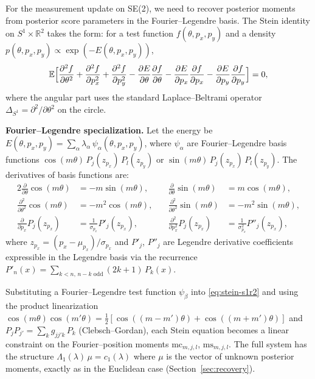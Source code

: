 \documentclass{article}
\newcommand{\R}{\mathbb{R}}
\newcommand{\E}{\mathbb{E}}
\theoremstyle{definition}
\begin{document}
For the measurement update on SE(2), we need to recover posterior
moments from posterior score parameters in the Fourier--Legendre basis.
The Stein identity on $S^1 \times \R^2$ takes the form:
for a test function $f(\theta, p_x, p_y)$ and a density
$p(\theta, p_x, p_y) \propto \exp(-E(\theta, p_x, p_y))$,
\begin{equation}\label{eq:stein-s1r2}
    \E\Bigl[\frac{\partial^2 f}{\partial \theta^2}
    + \frac{\partial^2 f}{\partial p_x^2}
    + \frac{\partial^2 f}{\partial p_y^2}
    - \frac{\partial E}{\partial \theta}\frac{\partial f}{\partial \theta}
    - \frac{\partial E}{\partial p_x}\frac{\partial f}{\partial p_x}
    - \frac{\partial E}{\partial p_y}\frac{\partial f}{\partial p_y}\Bigr] = 0,
\end{equation}
where the angular part uses the standard Laplace--Beltrami operator
$\Delta_{S^1} = \partial^2/\partial\theta^2$ on the circle.

\textbf{Fourier--Legendre specialization.}
Let the energy be
$E(\theta, p_x, p_y) = \sum_\alpha \lambda_\alpha\, \psi_\alpha(\theta, p_x, p_y)$,
where $\psi_\alpha$ are Fourier--Legendre basis functions
$\cos(m\theta)\,P_j(z_{p_x})\,P_l(z_{p_y})$ or
$\sin(m\theta)\,P_j(z_{p_x})\,P_l(z_{p_y})$.
The derivatives of basis functions are:
\begin{alignat}{2}
    \frac{\partial}{\partial\theta}\cos(m\theta)
    &= -m\sin(m\theta), &\quad
    \frac{\partial}{\partial\theta}\sin(m\theta)
    &= m\cos(m\theta), \nonumber\\
    \frac{\partial^2}{\partial\theta^2}\cos(m\theta)
    &= -m^2\cos(m\theta), &\quad
    \frac{\partial^2}{\partial\theta^2}\sin(m\theta)
    &= -m^2\sin(m\theta), \nonumber\\
    \frac{\partial}{\partial p_x}P_j(z_{p_x})
    &= \frac{1}{\sigma_{p_x}}P'_j(z_{p_x}), &\quad
    \frac{\partial^2}{\partial p_x^2}P_j(z_{p_x})
    &= \frac{1}{\sigma_{p_x}^2}P''_j(z_{p_x}),
    \label{eq:fl-derivs}
\end{alignat}
where $z_{p_x} = (p_x - \mu_{p_x})/\sigma_{p_x}$ and
$P'_j$, $P''_j$ are Legendre derivative coefficients
expressible in the Legendre basis via the recurrence
$P'_n(x) = \sum_{k < n,\, n{-}k\text{ odd}} (2k{+}1)\,P_k(x)$.

Substituting a Fourier--Legendre test function $\psi_\beta$ into
\eqref{eq:stein-s1r2} and using the product linearization
$\cos(m\theta)\cos(m'\theta) = \frac{1}{2}[\cos((m{-}m')\theta) + \cos((m{+}m')\theta)]$
and $P_j P_{j'} = \sum_k g_{jj'k}\,P_k$ (Clebsch--Gordan),
each Stein equation becomes a linear constraint on the
Fourier--position moments $\mathrm{mc}_{m,j,l}$, $\mathrm{ms}_{m,j,l}$.
The full system has the structure $\Lambda_1(\lambda)\,\mu = c_1(\lambda)$
where $\mu$ is the vector of unknown posterior moments,
exactly as in the Euclidean case (Section~\ref{sec:recovery}).
\end{document}
